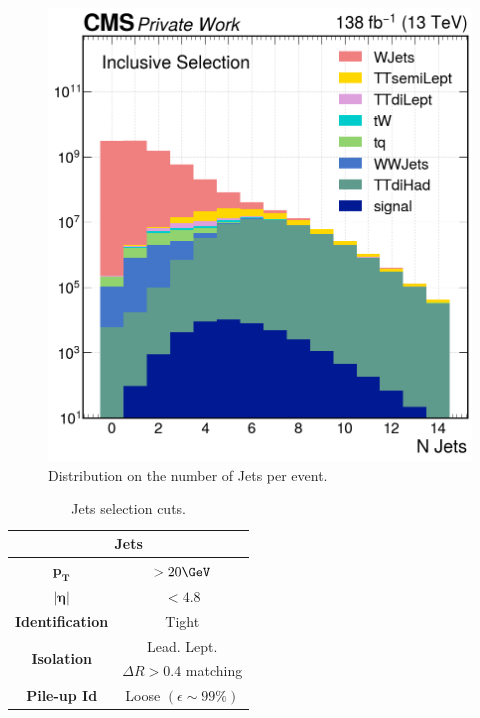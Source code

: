 \begin{minipage}{\linewidth}
\begin{minipage}{0.53\linewidth}
      \begin{figure}[H]
            \centering
            \includegraphics[width=1\linewidth]{fig//chap07-selection/nJet.png}
            \caption{Distribution on the number of Jets per event.}
            \label{fig:n_jet}
        \end{figure}
\end{minipage}
\hfill
\begin{minipage}{0.46\linewidth}
\vspace{-1.25cm}
\begin{table}[H]
    \centering
    \begin{tabular}{c|c}
        \toprule
        \multicolumn{2}{c}{\textbf{Jets}}\\
        \midrule
        \midrule
        
        $\mathbf{p_T}$& $>20 \GeV$\\
        \midrule
        $\bm{|\eta|}$& $<4.8$ \\
        \midrule
        \textbf{Identification} & Tight\\
        \midrule
        \multirow{2}{*}{\textbf{Isolation}} & Lead. Lept. \\
        &$\Delta R>0.4$ matching\\
        \midrule
        \textbf{Pile-up Id} & Loose  $(\epsilon\sim99\%)$ \\
        \bottomrule
    \end{tabular}
    \caption{Jets selection cuts.}
\end{table}
\end{minipage}   
\end{minipage}

